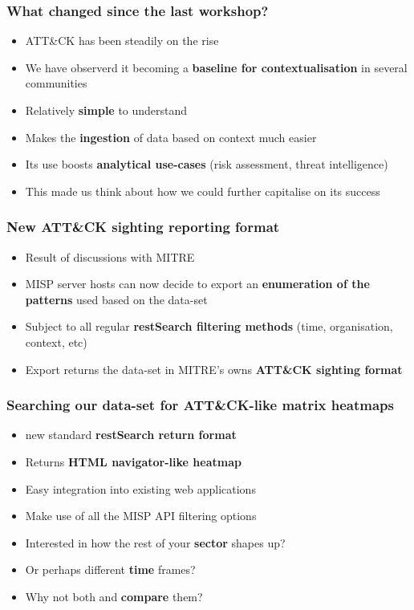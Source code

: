 
\begin{frame}
\titlepage
\end{frame}

\begin{frame}
  \frametitle{What changed since the last workshop?}
  \begin{itemize}
    \item ATT\&CK has been steadily on the rise
    \item We have observerd it becoming a {\bf baseline for contextualisation} in several communities
    \item Relatively {\bf simple} to understand
    \item Makes the {\bf ingestion} of data based on context much easier
    \item Its use boosts {\bf analytical use-cases} (risk assessment, threat intelligence)
    \item This made us think about how we could further capitalise on its success
  \end{itemize}
\end{frame}

\begin{frame}
  \frametitle{New ATT\&CK sighting reporting format}
  \begin{itemize}
    \item Result of discussions with MITRE
    \item MISP server hosts can now decide to export an {\bf enumeration of the patterns} used based on the data-set
    \item Subject to all regular {\bf restSearch filtering methods} (time, organisation, context, etc)
    \item Export returns the data-set in MITRE's owns {\bf ATT\&CK sighting format}
  \end{itemize}
\end{frame}

\begin{frame}
  \frametitle{Searching our data-set for ATT\&CK-like matrix heatmaps}
  \begin{itemize}
    \item new standard {\bf restSearch return format}
    \item Returns {\bf HTML navigator-like heatmap}
    \item Easy integration into existing web applications
    \item Make use of all the MISP API filtering options
    \item Interested in how the rest of your {\bf sector} shapes up?
    \item Or perhaps different {\bf time} frames?
    \item Why not both and {\bf compare} them?
  \end{itemize}
\end{frame}

